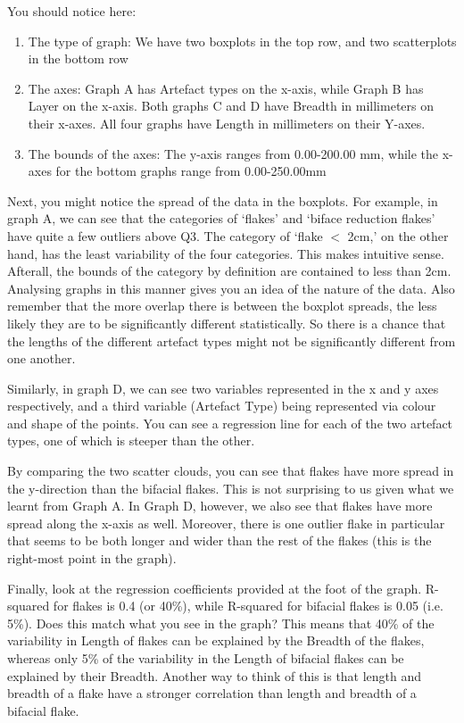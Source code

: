 \documentclass{article}
\begin{document}
You should notice here:

\begin{enumerate}
    \item The type of graph: We have two boxplots in the top row, and two scatterplots in the bottom row
    \item The axes: Graph A has Artefact types on the x-axis, while Graph B has Layer on the x-axis. Both graphs C and D have Breadth in millimeters on their x-axes. All four graphs have Length in millimeters on their Y-axes.
    \item The bounds of the axes: The y-axis ranges from 0.00-200.00 mm, while the x-axes for the bottom graphs range from 0.00-250.00mm
\end{enumerate}

Next, you might notice the spread of the data in the boxplots. For example, in graph A, we can see that the categories of ‘flakes’ and ‘biface reduction flakes’ have quite a few outliers above Q3. The category of ‘flake $<$ 2cm,’ on the other hand, has the least variability of the four categories. This makes intuitive sense. Afterall, the bounds of the category by definition are contained to less than 2cm. Analysing graphs in this manner gives you an idea of the nature of the data. Also remember that the more overlap there is between the boxplot spreads, the less likely they are to be significantly different statistically. So there is a chance that the lengths of the different artefact types might not be significantly different from one another. 

Similarly, in graph D, we can see two variables represented in the x and y axes respectively, and a third variable (Artefact Type) being represented via colour and shape of the points. You can see a regression line for each of the two artefact types, one of which is steeper than the other. 

By comparing the two scatter clouds, you can see that flakes have more spread in the y-direction than the bifacial flakes. This is not surprising to us given what we learnt from Graph A. In Graph D, however, we also see that flakes have more spread along the x-axis as well. Moreover, there is one outlier flake in particular that seems to be both longer and wider than the rest of the flakes (this is the right-most point in the graph).

Finally, look at the regression coefficients provided at the foot of the graph. R-squared for flakes is 0.4 (or 40\%), while R-squared for bifacial flakes is 0.05 (i.e. 5\%). Does this match what you see in the graph? This means that 40\% of the variability in Length of flakes can be explained by the Breadth of the flakes, whereas only 5\% of the variability in the Length of bifacial flakes can be explained by their Breadth. Another way to think of this is that length and breadth of a flake have a stronger correlation than length and breadth of a bifacial flake.
\end{document}
